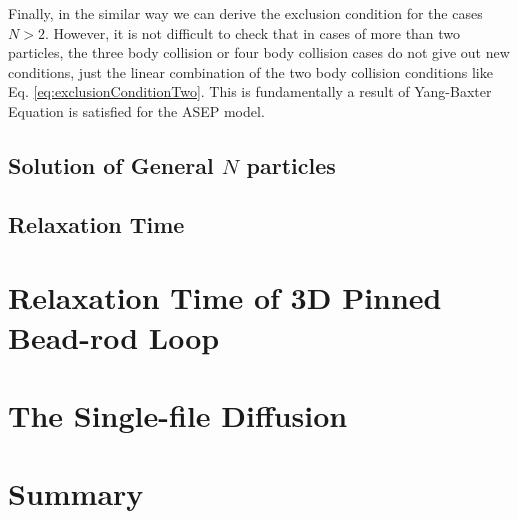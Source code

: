 Finally, in the similar way we can derive the exclusion condition for the cases $N>2$. However, it is not difficult to check that in cases of more than two particles, the three body collision or four body collision cases do not give out new conditions, just the linear combination of the two body collision conditions like Eq. \eqref{eq:exclusionConditionTwo}. This is fundamentally a result of Yang-Baxter Equation is satisfied for the ASEP model.




\subsection{Solution of General $N$ particles}
\label{sub:solution_of_general_n_particles}

\subsection{Relaxation Time}
\label{sub:relaxation_time}





\section{Relaxation Time of 3D Pinned Bead-rod Loop}
\label{sec:relaxation_time_of_3d_pinned_bead_rod_loop}


\section{The Single-file Diffusion}
\label{sec:the_single_file_diffusion}



\section{Summary}
\label{sec:summary}
